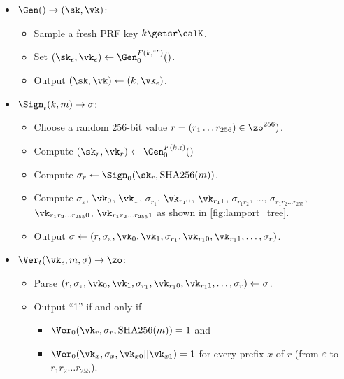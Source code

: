 \begin{framed}
\begin{itemize}
  \item $\Gen() \to (\sk, \vk)$:
    \begin{itemize}
      \item Sample a fresh PRF key $k \getsr \calK$.
      \item Set $(\sk_\epsilon, \vk_\epsilon) \gets \Gen_0^{F(k, \text{``''})}()$.
      \item Output $(\sk, \vk) \gets (k, \vk_\epsilon)$.
    \end{itemize}

  \item $\Sign_t(k, m) \to \sigma$: 
    \begin{itemize}
      \item Choose a random 256-bit value $r = (r_1 \dots r_{256}) \in \zo^{256})$.
      \item Compute $(\sk_r, \vk_r) \gets \Gen_0^{F(k, \text{r})}()$
      \item Compute $\sigma_r \gets \Sign_0(\sk_r, \text{SHA256}(m))$.
      \item Compute $\sigma_\varepsilon$, $\vk_0$, $\vk_1$,
                    $\sigma_{r_1}$, $\vk_{r_1 0}$, $\vk_{r_1 1}$,
                    $\sigma_{r_1 r_2}$, $\ldots$,
                    $\sigma_{r_1 r_2 \ldots r_{255}}$,
                    $\vk_{r_1 r_2 \ldots r_{255} 0}$,
                    $\vk_{r_1 r_2 \ldots r_{255} 1}$
            as shown in \cref{fig:lamport_tree}.
      \item Output $\sigma \gets (r, \sigma_\varepsilon, \vk_0, \vk_1, \sigma_{r_1}, \vk_{r_1 0}, \vk_{r_1 1}, \ldots, \sigma_r)$.
    \end{itemize}
  \item $\Ver_t(\vk_\epsilon, m, \sigma) \to \zo$:
    \begin{itemize}
      \item Parse $(r, \sigma_\varepsilon, \vk_0, \vk_1, \sigma_{r_1}, \vk_{r_1 0}, \vk_{r_1 1}, \ldots, \sigma_r) \gets \sigma$.
      \item Output ``1'' if and only if 
        \begin{itemize}
          \item $\Ver_0(\vk_r, \sigma_r, \text{SHA256}(m)) = 1$
        and 
      \item $\Ver_0(\vk_x, \sigma_x, \vk_{x0} || \vk_{x1}) = 1$ for every
        prefix $x$ of $r$ (from $\varepsilon$ to $r_1 r_2 \ldots r_{255}$).
        \end{itemize}
    \end{itemize}
\end{itemize}
\end{framed}



